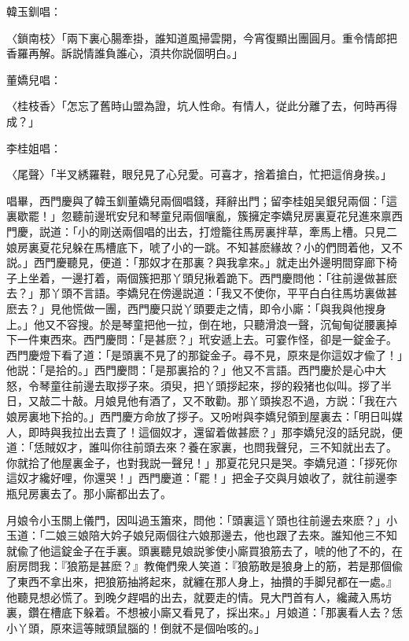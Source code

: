 韓玉釧唱：

\begin{myquote}
{\markfont〈鎖南枝〉}「兩下裏心腸牽掛，誰知道風掃雲開，今宵復顯出團圓月。重令情郎把香羅再解。訴説情誰負誰心，湏共你説個明白。」
\end{myquote}

董嬌兒唱：

\begin{myquote}
{\markfont〈桂枝香〉}「怎忘了舊時山盟為證，坑人性命。有情人，従此分離了去，何時再得成？」
\end{myquote}

李桂姐唱：

\begin{myquote}
{\markfont〈尾聲〉}「半叉綉羅鞋，眼兒見了心兒愛。可喜才，捨着搶白，忙把這俏身挨。」
\end{myquote}

唱畢，西門慶與了韓玉釧董嬌兒兩個唱錢，拜辭出門；留李桂姐吴銀兒兩個：「這裏歇罷！」忽聽前邊玳安兒和琴童兒兩個嚷亂，簇擁定李嬌兒房裏夏花兒進來禀西門慶，説道：「小的剛送兩個唱的出去，打燈籠往馬房裏拌草，牽馬上槽。只見二娘房裏夏花兒躲在馬槽底下，唬了小的一跳。不知甚麽緣故？小的們問着他，又不説。」西門慶聽見，便道：「那奴才在那裏？與我拿來。」就走出外邊明間穿廊下椅子上坐着，一邊打着，兩個簇把那丫頭兒揪着跪下。西門慶問他：「往前邊做甚麽去？」那丫頭不言語。李嬌兒在傍邊説道：「我又不使你，平平白白往馬坊裏做甚麽去？」見他慌做一團，西門慶只説丫頭要走之情，即令小廝：「與我與他搜身上。」他又不容搜。於是琴童把他一拉，倒在地，只聽滑浪一聲，沉甸甸従腰裏掉下一件東西來。西門慶問：「是甚麽？」玳安遞上去。可霎作怪，卻是一錠金子。西門慶燈下看了道：「是頭裏不見了的那錠金子。尋不見，原來是你這奴才偸了！」他説：「是拾的。」西門慶問：「是那裏拾的？」他又不言語。西門慶於是心中大怒，令琴童往前邊去取拶子來。須臾，把丫頭拶起來，拶的殺猪也似叫。拶了半日，又敲二十敲。月娘見他有酒了，又不敢勸。那丫頭挨忍不過，方説：「我在六娘房裏地下拾的。」西門慶方命放了拶子。又吩咐與李嬌兒領到屋裏去：「明日叫媒人，即時與我拉出去賣了！這個奴才，還留着做甚麽？」那李嬌兒沒的話兒説，便道：「恁賊奴才，誰叫你往前頭去來？養在家裏，也問我聲兒，三不知就出去了。你就拾了他屋裏金子，也對我説一聲兒！」那夏花兒只是哭。李嬌兒道：「拶死你這奴才纔好哩，你還哭！」西門慶道：「罷！」把金子交與月娘收了，就往前邊李瓶兒房裏去了。那小廝都出去了。

月娘令小玉關上儀門，因叫過玉簫來，問他：「頭裏這丫頭也往前邊去來麽？」小玉道：「二娘三娘陪大妗子娘兒兩個往六娘那邊去，他也跟了去來。誰知他三不知就偸了他這錠金子在手裏。頭裏聽見娘説爹使小廝買狼筋去了，唬的他了不的，在廚房問我：『狼筋是甚麽？』教俺們衆人笑道：『狼筋敢是狼身上的筋，若是那個偸了東西不拿出來，把狼筋抽將起來，就纏在那人身上，抽攢的手脚兒都在一處。』他聽見想必慌了。到晚夕趕唱的出去，就要走的情。見大門首有人，纔藏入馬坊裏，鑽在槽底下躲着。不想被小廝又看見了，採出來。」月娘道：「那裏看人去？恁小丫頭，原來這等賊頭鼠腦的！倒就不是個咍咳的。」

